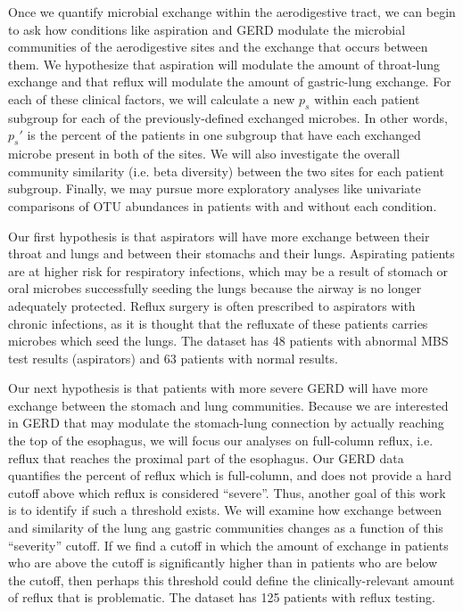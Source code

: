 \documentclass[12pt]{article}
\begin{document}
Once we quantify microbial exchange within the aerodigestive tract, we 
can begin to ask how conditions like aspiration and GERD modulate the
microbial communities of the aerodigestive sites and the exchange 
that occurs between them. We hypothesize that aspiration will modulate the 
amount of throat-lung exchange and that reflux will modulate 
the amount of gastric-lung exchange.
For each of these clinical factors, we will calculate a new $p_s$ within each patient 
subgroup for each of the previously-defined exchanged microbes.
In other words, $p_s'$ is the percent of the patients in one subgroup
that have each exchanged microbe present in both of the sites.
We will also investigate the overall community similarity (i.e. beta diversity) 
between the two sites for each patient subgroup. Finally, we may pursue
more exploratory analyses like univariate comparisons of OTU abundances
in patients with and without each condition.

Our first hypothesis is that aspirators will have more exchange between their throat and lungs and between their stomachs and their lungs.
Aspirating patients are at higher risk for respiratory infections, which
may be a result of stomach or oral microbes successfully seeding the lungs
because the airway is no longer adequately protected.
Reflux surgery is often prescribed to aspirators with chronic infections,
as it is thought that the refluxate of these patients carries microbes which seed the lungs. 
The dataset has 48 patients with abnormal MBS test results (aspirators) and 63 patients with normal results.

Our next hypothesis is that patients with more severe GERD will have 
more exchange between the stomach and lung communities. Because we are 
interested in GERD that may modulate the stomach-lung connection by
actually reaching the top of the esophagus, we will focus our analyses
on full-column reflux, i.e. reflux that reaches the proximal part of the esophagus.
Our GERD data quantifies the
percent of reflux which is full-column, and does not provide a hard
cutoff above which reflux is considered ``severe''. Thus, another goal
of this work is to identify if such a threshold exists. We will examine
how exchange between and similarity of the lung ang gastric communities
changes as a function of this ``severity'' cutoff. If we find a cutoff
in which the amount of exchange in patients who are above the cutoff is 
significantly higher than in patients who are below the cutoff, then perhaps
this threshold could define the clinically-relevant amount of reflux that is
problematic. The dataset has 125 patients with reflux testing.
\end{document}
